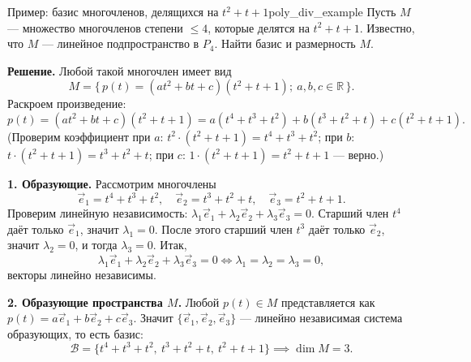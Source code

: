 \documentclass[12pt,a4paper]{article}
\begin{document}
\begin{definition}{Пример: базис многочленов,
  делящихся на $t^2+t+1$}{poly_div_example}
  Пусть $M$ --- множество многочленов степени $\le 4$, которые делятся
  на $t^2 + t + 1$. Известно, что $M$ --- линейное подпространство в
  $P_4$. Найти базис и размерность $M$.

  \textbf{Решение.} Любой такой многочлен имеет вид
  \[
    M = \{\, p(t) = (at^2 + bt + c)(t^2 + t + 1); \ a, b, c \in
    \mathbb{R} \,\}.
  \]
  Раскроем произведение:
  \[
    p(t) = (at^2 + bt + c)(t^2 + t + 1) = a(t^4 + t^3 + t^2) + b(t^3 +
    t^2 + t) + c(t^2 + t + 1).
  \]
  (Проверим коэффициент при $a$: $t^2\cdot(t^2+t+1) = t^4 + t^3 +
    t^2$; при $b$: $t\cdot(t^2+t+1) = t^3 + t^2 + t$; при $c$:
  $1\cdot(t^2+t+1) = t^2 + t + 1$ --- верно.)

  \textbf{1. Образующие.} Рассмотрим многочлены
  \[
    \vec{e}_1 = t^4 + t^3 + t^2, \quad \vec{e}_2 = t^3 + t^2 + t,
    \quad \vec{e}_3 = t^2 + t + 1.
  \]
  Проверим линейную независимость: $\lambda_1\vec{e}_1 +
  \lambda_2\vec{e}_2 + \lambda_3\vec{e}_3 = 0$. Старший член $t^4$
  даёт только $\vec{e}_1$, значит $\lambda_1 = 0$. После этого старший
  член $t^3$ даёт только $\vec{e}_2$, значит $\lambda_2 = 0$, и тогда
  $\lambda_3 = 0$. Итак,
  \[
    \lambda_1\vec{e}_1 + \lambda_2\vec{e}_2 + \lambda_3\vec{e}_3 = 0
    \iff \lambda_1 = \lambda_2 = \lambda_3 = 0,
  \]
  векторы линейно независимы.

  \textbf{2. Образующие пространства $M$.} Любой $p(t) \in M$
  представляется как $p(t) = a\vec{e}_1 + b\vec{e}_2 + c\vec{e}_3$.
  Значит $\{\vec{e}_1, \vec{e}_2, \vec{e}_3\}$ --- линейно независимая
  система образующих, то есть базис:
  \[
    \mathcal{B} = \{t^4 + t^3 + t^2,\ t^3 + t^2 + t,\ t^2 + t + 1\}
    \implies \dim M = 3.
  \]
\end{definition}
\end{document}
